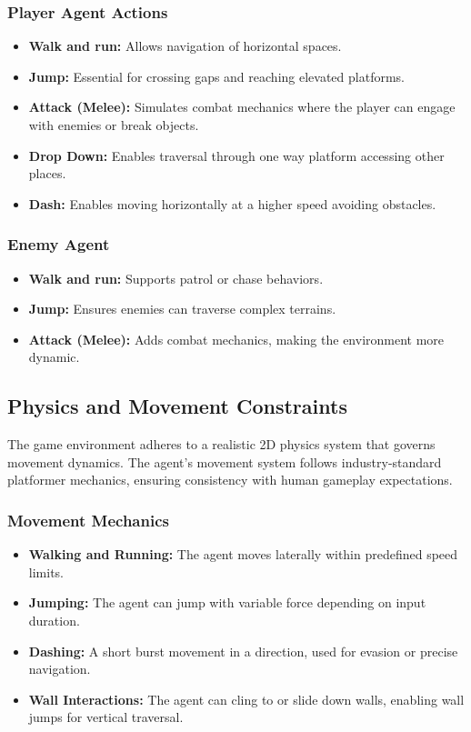 \documentclass[12pt,oneside,openright,a4paper]{cpe-english-project}
\begin{document}
\subsubsection{Player Agent Actions}
\begin{itemize}
\item  \textbf{Walk and run:} Allows navigation of horizontal spaces.
\item  \textbf{Jump:} Essential for crossing gaps and reaching elevated platforms.
\item  \textbf{Attack (Melee):} Simulates combat mechanics where the player can engage with enemies or break objects.
\item  \textbf{Drop Down:} Enables traversal through one way platform accessing other places.
\item  \textbf{Dash:} Enables moving horizontally at a higher speed avoiding obstacles.
\end{itemize}
\subsubsection{Enemy Agent}
\begin{itemize}
\item  \textbf{Walk and run:} Supports patrol or chase behaviors.
\item  \textbf{Jump:} Ensures enemies can traverse complex terrains.
\item  \textbf{Attack (Melee):} Adds combat mechanics, making the environment more dynamic.
\end{itemize}
\subsection{Physics and Movement Constraints}
The game environment adheres to a realistic 2D physics system that governs movement dynamics. The agent’s movement system follows industry-standard platformer mechanics, ensuring consistency with human gameplay expectations.
\subsubsection{Movement Mechanics}
\begin{itemize}
\item  \textbf{Walking and Running:} The agent moves laterally within predefined speed limits.
\item  \textbf{Jumping:} The agent can jump with variable force depending on input duration.
\item  \textbf{Dashing:} A short burst movement in a direction, used for evasion or precise navigation.
\item  \textbf{Wall Interactions:} The agent can cling to or slide down walls, enabling wall jumps for vertical traversal.
\end{itemize}
\end{document}
